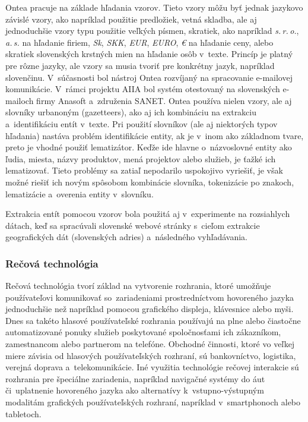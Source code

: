 \begin{multicols}{2}
Ontea pracuje na základe hľadania vzorov. Tieto vzory môžu byť
jednak jazykovo závislé vzory, ako napríklad použitie predložiek,
vetná skladba, ale aj jednoduchšie vzory typu použitie veľkých
písmen, skratiek, ako napríklad \emph{s.\,r.\,o.}, \emph{a.\,s.} na
hľadanie firiem, \emph{Sk}, \emph{SKK}, \emph{EUR}, \emph{EURO},
\emph{€} na hľadanie ceny, alebo skratiek slovenských krstných
mien na hľadanie osôb v~texte. Princíp je platný pre rôzne jazyky,
ale vzory sa musia tvoriť pre konkrétny jazyk, napríklad slovenčinu.
V~súčasnosti bol nástroj Ontea rozvíjaný na spracovanie e-mailovej
komunikácie. V~rámci projektu
AIIA\cite{f29} \cite{laclavik2010} bol
systém otestovaný na slovenských e-mailoch firmy Anasoft a~združenia
SANET. Ontea používa nielen vzory, ale aj slovníky urbanoným
(gazetteers), ako aj ich kombináciu na extrakciu a~identifikáciu
entít v~texte. Pri použití slovníkov (ale aj niektorých typov
hľadania) nastáva problém identifikácie entity, ak je v~inom ako
základnom tvare, preto je vhodné použiť lematizátor. Keďže ide
hlavne o~názvoslovné entity ako ľudia, miesta, názvy produktov,
mená projektov alebo služieb, je ťažké ich lematizovať. Tieto
problémy sa zatiaľ nepodarilo uspokojivo vyriešiť, je však možné
riešiť ich novým spôsobom kombinácie slovníka, tokenizácie po
znakoch, lematizácie a~overenia entity v~slovníku.

Extrakcia entít pomocou vzorov bola použitá aj v~experimente na rozsiahlych dátach, keď sa spracúvali slovenské webové stránky s~cieľom extrakcie geografických dát (slovenských adries) a~následného vyhľadávania\cite{dlugolinsky2010}.

\subsubsection{Rečová technológia}
Rečová technológia tvorí základ na vytvorenie rozhrania, ktoré umožňuje používateľovi komunikovať so~zariadeniami prostredníctvom hovoreného jazyka jednoduchšie než napríklad pomocou grafického displeja, klávesnice alebo myši. Dnes sa takéto hlasové používateľské rozhrania používajú na plne alebo čiastočne automatizované ponuky služieb poskytované spoločnosťami ich zákazníkom, zamestnancom alebo partnerom na telefóne. Obchodné činnosti, ktoré vo veľkej miere závisia od hlasových používateľských rozhraní, sú bankovníctvo, logistika, verejná doprava a~telekomunikácie. Iné využitia technológie rečovej interakcie sú rozhrania pre špeciálne zariadenia, napríklad navigačné systémy do  áut či~uplatnenie hovoreného jazyka ako alternatívy k~vstupno-výstupným modalitám grafických používateľských rozhraní, napríklad v~smartphonoch alebo tabletoch. 


\end{multicols}
